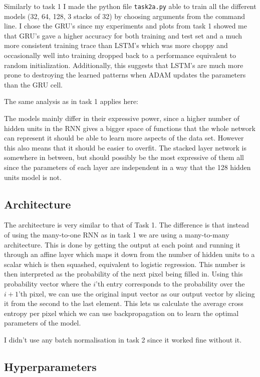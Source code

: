 \documentclass{article}
\begin{document}
Similarly to task 1 I made the python file \texttt{task2a.py} able to train all
the different models (32, 64, 128, 3 stacks of 32) by choosing arguments from
the command line. I chose the GRU's since my experiments and plots from task 1
showed me that GRU's gave a higher accuracy for both training and test set and a
much more consistent training trace than LSTM's which was more choppy and
occasionally well into training dropped back to a performance equivalent to
random initialization. Additionally, this suggests that LSTM's are much more
prone to destroying the learned patterns when ADAM updates the parameters than
the GRU cell.

The same analysis as in task 1 applies here:

The models mainly differ in their expressive power, since a higher number of
hidden units in the RNN gives a bigger space of functions that the whole network
can represent it should be able to learn more aspects of the data set. However
this also means that it should be easier to overfit. The stacked layer network
is somewhere in between, but should possibly be the most expressive of them all
since the parameters of each layer are independent in a way that the 128 hidden
units model is not.

\subsection{Architecture}

The architecture is very similar to that of Task 1. The difference is that
instead of using the many-to-one RNN as in task 1 we are using a many-to-many
architecture. This is done by getting the output at each point and running it
through an affine layer which maps it down from the number of hidden units to a
scalar which is then squashed, equivalent to logistic regression. This number is
then interpreted as the probability of the next pixel being filled in. Using
this probability vector where the $i$'th entry corresponds to the probability
over the $i+1$'th pixel, we can use the original input vector as our output
vector by slicing it from the second to the last element. This lets us calculate
the average cross entropy per pixel which we can use backpropagation on to learn
the optimal parameters of the model.

I didn't use any batch normalisation in task 2 since it worked fine without it.

\subsection{Hyperparameters}
\end{document}
